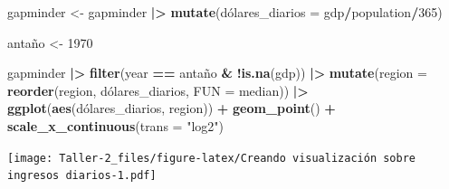 \documentclass[
]{article}
\newenvironment{Shaded}{\begin{snugshade}}{\end{snugshade}}
\newcommand{\AttributeTok}[1]{\textcolor[rgb]{0.13,0.29,0.53}{#1}}
\newcommand{\DecValTok}[1]{\textcolor[rgb]{0.00,0.00,0.81}{#1}}
\newcommand{\FunctionTok}[1]{\textcolor[rgb]{0.13,0.29,0.53}{\textbf{#1}}}
\newcommand{\NormalTok}[1]{#1}
\newcommand{\OtherTok}[1]{\textcolor[rgb]{0.56,0.35,0.01}{#1}}
\newcommand{\SpecialCharTok}[1]{\textcolor[rgb]{0.81,0.36,0.00}{\textbf{#1}}}
\newcommand{\StringTok}[1]{\textcolor[rgb]{0.31,0.60,0.02}{#1}}
\begin{document}
\begin{Shaded}
\begin{Highlighting}[]
\NormalTok{gapminder }\OtherTok{\textless{}{-}}\NormalTok{ gapminder }\SpecialCharTok{|\textgreater{}} \FunctionTok{mutate}\NormalTok{(dólares}\AttributeTok{\_diarios =}\NormalTok{ gdp}\SpecialCharTok{/}\NormalTok{population}\SpecialCharTok{/}\DecValTok{365}\NormalTok{)}

\NormalTok{antaño }\OtherTok{\textless{}{-}} \DecValTok{1970}

\NormalTok{gapminder }\SpecialCharTok{|\textgreater{}}
  \FunctionTok{filter}\NormalTok{(year }\SpecialCharTok{==}\NormalTok{ antaño }\SpecialCharTok{\&} \SpecialCharTok{!}\FunctionTok{is.na}\NormalTok{(gdp)) }\SpecialCharTok{|\textgreater{}}
  \FunctionTok{mutate}\NormalTok{(}\AttributeTok{region =} \FunctionTok{reorder}\NormalTok{(region, dólares\_diarios, }\AttributeTok{FUN =}\NormalTok{ median)) }\SpecialCharTok{|\textgreater{}}
  \FunctionTok{ggplot}\NormalTok{(}\FunctionTok{aes}\NormalTok{(dólares\_diarios, region)) }\SpecialCharTok{+}
  \FunctionTok{geom\_point}\NormalTok{() }\SpecialCharTok{+}
  \FunctionTok{scale\_x\_continuous}\NormalTok{(}\AttributeTok{trans =} \StringTok{"log2"}\NormalTok{)}
\end{Highlighting}
\end{Shaded}

\texttt{[image: Taller-2\_files/figure-latex/Creando visualización sobre ingresos diarios-1.pdf]}
\end{document}
